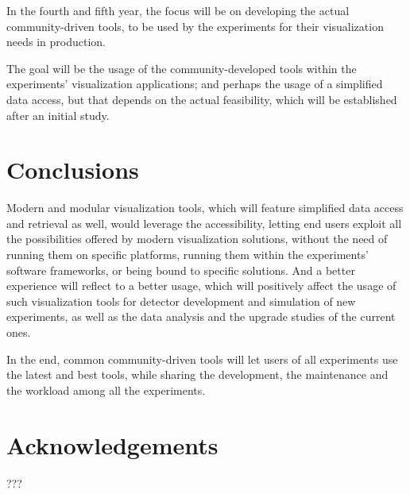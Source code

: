 \documentclass[12pt,a4paper]{article}
\begin{document}
In the fourth and fifth year, the focus will be on developing the actual community-driven tools, to be used by the experiments
for their visualization needs in production.

The goal will be the usage of the community-developed tools within the experiments’ visualization applications; and
perhaps the usage of a simplified data access, but that depends on the actual feasibility, which will be established
after an initial study.

\hypertarget{conclusions}{%
\section{Conclusions}\label{conclusions}}

Modern and modular visualization tools, which will feature simplified data access and retrieval as well, would leverage
the accessibility, letting end users exploit all the possibilities offered by modern visualization solutions, without the need
of running them on specific platforms, running them within the experiments’ software frameworks, or being bound to specific solutions.
And a better experience will reflect to a better usage, which will positively affect the usage of such visualization tools for
detector development and simulation of new experiments, as well as the data analysis and the upgrade studies of the current ones.

In the end, common community-driven tools will let users of all experiments use the latest and best tools, while sharing the development,
the maintenance and the workload among all the experiments.
 
\hypertarget{acknowledgements}{%
\section{Acknowledgements}\label{acknowledgements}}


???

%
\end{document}
